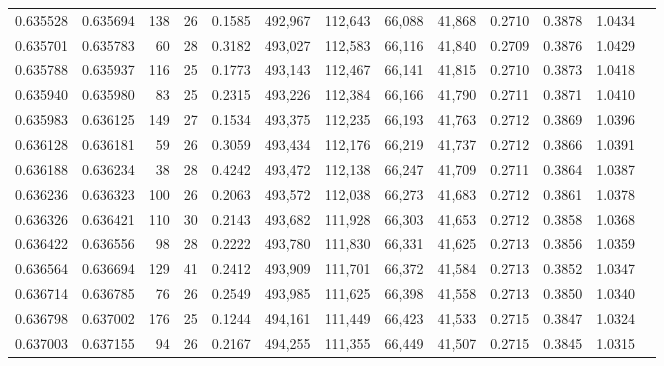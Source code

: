 \begin{tabular}{rrrrrrrrrrrrr}
0.635528 & 0.635694 &   138 &  26 &                                     0.1585 & 492,967 & 112,643 &  66,088 &  41,868 & 0.2710 & 0.3878 & 1.0434 \\
0.635701 & 0.635783 &    60 &  28 &                                     0.3182 & 493,027 & 112,583 &  66,116 &  41,840 & 0.2709 & 0.3876 & 1.0429 \\
0.635788 & 0.635937 &   116 &  25 &                                     0.1773 & 493,143 & 112,467 &  66,141 &  41,815 & 0.2710 & 0.3873 & 1.0418 \\
0.635940 & 0.635980 &    83 &  25 &                                     0.2315 & 493,226 & 112,384 &  66,166 &  41,790 & 0.2711 & 0.3871 & 1.0410 \\
0.635983 & 0.636125 &   149 &  27 &                                     0.1534 & 493,375 & 112,235 &  66,193 &  41,763 & 0.2712 & 0.3869 & 1.0396 \\
0.636128 & 0.636181 &    59 &  26 &                                     0.3059 & 493,434 & 112,176 &  66,219 &  41,737 & 0.2712 & 0.3866 & 1.0391 \\
0.636188 & 0.636234 &    38 &  28 &                                     0.4242 & 493,472 & 112,138 &  66,247 &  41,709 & 0.2711 & 0.3864 & 1.0387 \\
0.636236 & 0.636323 &   100 &  26 &                                     0.2063 & 493,572 & 112,038 &  66,273 &  41,683 & 0.2712 & 0.3861 & 1.0378 \\
0.636326 & 0.636421 &   110 &  30 &                                     0.2143 & 493,682 & 111,928 &  66,303 &  41,653 & 0.2712 & 0.3858 & 1.0368 \\
0.636422 & 0.636556 &    98 &  28 &                                     0.2222 & 493,780 & 111,830 &  66,331 &  41,625 & 0.2713 & 0.3856 & 1.0359 \\
0.636564 & 0.636694 &   129 &  41 &                                     0.2412 & 493,909 & 111,701 &  66,372 &  41,584 & 0.2713 & 0.3852 & 1.0347 \\
0.636714 & 0.636785 &    76 &  26 &                                     0.2549 & 493,985 & 111,625 &  66,398 &  41,558 & 0.2713 & 0.3850 & 1.0340 \\
0.636798 & 0.637002 &   176 &  25 &                                     0.1244 & 494,161 & 111,449 &  66,423 &  41,533 & 0.2715 & 0.3847 & 1.0324 \\
0.637003 & 0.637155 &    94 &  26 &                                     0.2167 & 494,255 & 111,355 &  66,449 &  41,507 & 0.2715 & 0.3845 & 1.0315 \\

\end{tabular}
